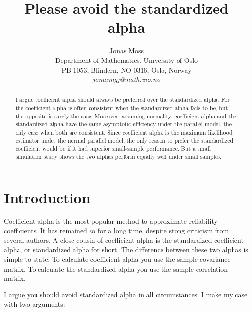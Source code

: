 \documentclass{article}
\title{Please avoid the standardized alpha}
\author{
  Jonas Moss \\
  Department of Mathematics, University of Oslo\\
  PB 1053, Blindern, NO-0316, Oslo, Norway \\
  \it{jonasmgj@math.uio.no}
}
\theoremstyle{plain}
\theoremstyle{plain}
\theoremstyle{definition}
\theoremstyle{remark}
\theoremstyle{definition}
\theoremstyle{plain}
\theoremstyle{plain}
\theoremstyle{definition}
\begin{document}
\maketitle

\begin{abstract}
I argue coefficient alpha should always be preferred over the standardized alpha. For the coefficient alpha is often consistent when the standardized alpha fails to be, but the opposite is rarely the case. Moreover, assuming normality, coefficient alpha and the standardized alpha have the same asymptotic efficiency under the parallel model, the only case when both are consistent. Since coefficient alpha is the maximum likelihood estimator under the normal parallel model, the only reason to prefer the standardized coefficient would be if it had superior small-sample performance. But a small simulation study shows the two alphas perform equally well under small samples.
\end{abstract}


\section{Introduction}
Coefficient alpha is the most popular method to approximate reliability coefficients. It has remained so for a long time, despite stong criticism from several authors. A close cousin of coefficient alpha is the standardized coefficient alpha, or standardized alpha for short. The difference between these two alphas is simple to state: To calculate coefficient alpha you use the sample covariance matrix. To calculate the standardized alpha you use the sample correlation matrix.

I argue you should avoid standardized alpha in all circumstances. I make my case with two arguments:
\end{document}
